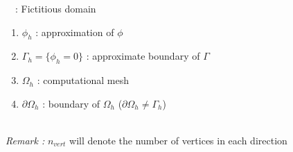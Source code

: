 \begin{frame}{\appendixname~\theappendixframenumber~: Fictitious domain}
	
	\vspace{10pt}
	
	\begin{center}
		\begin{minipage}{0.43\linewidth}
			\centering
		\end{minipage} \hfill
		\begin{minipage}{0.1\linewidth}
			\centering
		\end{minipage} \hfill
		\begin{minipage}{0.43\linewidth}
			\centering
		\end{minipage}
	\end{center}
	
	\begin{enumerate}[\ding{217}]
		\item $\phi_h$ : approximation of $\phi$ \\ 
		\item $\Gamma_h=\{\phi_h=0\}$ : approximate boundary of $\Gamma$
		\item $\Omega_h$ : computational mesh
		\item $\partial\Omega_h$ : boundary of $\Omega_h$ ($\partial\Omega_h \ne \Gamma_h$)
	\end{enumerate}	
	
	\footnotesize
	\; \\
	\textit{Remark :} $n_{vert}$ will denote the number of vertices in each direction
\end{frame}

